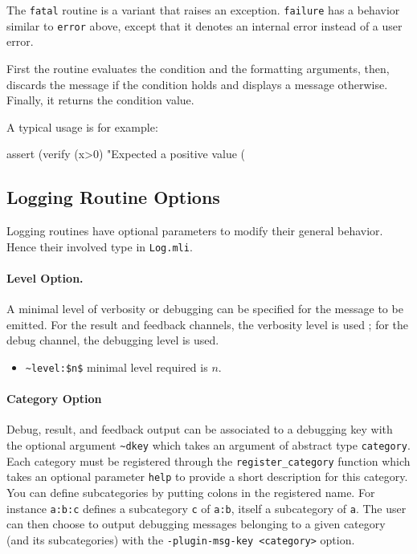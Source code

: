 \begin{description}
  The \lstinline{fatal} routine is a variant that raises an exception.
  \lstinline{failure} has a behavior similar to \lstinline{error} above,
  except that it denotes an internal error instead of a user error.

  First the routine evaluates the condition and the formatting
  arguments, then, discards the message if the condition holds and
  displays a message otherwise. Finally, it returns the condition value.

  A typical usage is for example:
  \begin{ocamlcode}
    assert (verify (x>0) "Expected a positive value (%
  \end{ocamlcode}

\end{description}

\subsection{Logging Routine Options}

Logging routines have optional parameters to modify their general
behavior. Hence their involved type in \texttt{Log.mli}.

\paragraph{Level Option.} A minimal level of verbosity or debugging can be
specified for the message to be emitted. For the result and feedback
channels, the verbosity level is used ; for the debug channel, the
debugging level is used.
\begin{itemize}
\item[] \lstinline{~level:$n$} minimal level required is $n$.
\end{itemize}

\paragraph{Category Option} Debug, result, and feedback
output can be associated to a debugging key with the optional argument
\lstinline{~dkey} which takes an argument of abstract type
\lstinline|category|.
Each category must be registered through the \lstinline|register_category|
function which takes an optional parameter \lstinline|help| to provide a
short description for this category. You can define subcategories by putting
colons in the registered name. For instance \lstinline|a:b:c| defines a
subcategory \lstinline|c| of \lstinline|a:b|, itself a subcategory of
\lstinline|a|. The user can then choose to output debugging messages belonging
to a given category (and its subcategories) with the
\lstinline{-plugin-msg-key <category>} option.

